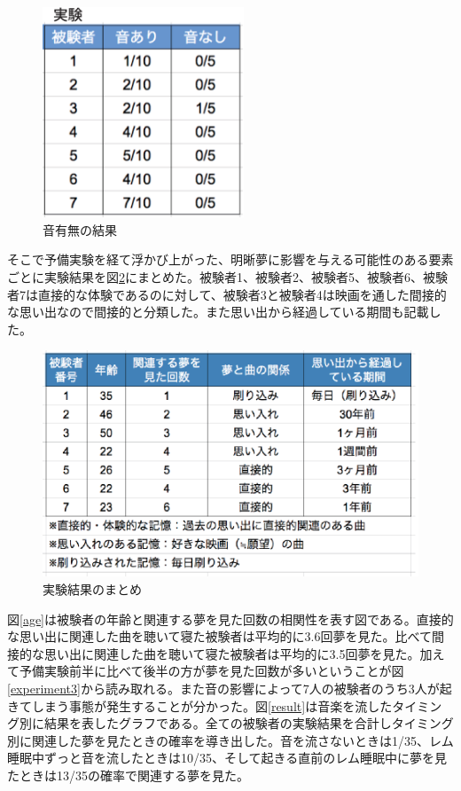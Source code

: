 \begin{figure}[htbp]
\begin{center}
\includegraphics[width=6cm]{eps/musicOnNO.eps}
\caption{音有無の結果}
\label{musciOnNo}
\end{center}
\end{figure}

そこで予備実験を経て浮かび上がった、明晰夢に影響を与える可能性のある要素ごとに実験結果を図\ref{categorizedData}にまとめた。被験者1、被験者2、被験者5、被験者6、被験者7は直接的な体験であるのに対して、被験者3と被験者4は映画を通した間接的な思い出なので間接的と分類した。また思い出から経過している期間も記載した。

\begin{figure}[htbp]
\begin{center}
\includegraphics[width=13cm]{eps/categorizedData.eps}
\caption{実験結果のまとめ}
\label{categorizedData}
\end{center}
\end{figure}

図\ref{age}は被験者の年齢と関連する夢を見た回数の相関性を表す図である。直接的な思い出に関連した曲を聴いて寝た被験者は平均的に3.6回夢を見た。比べて間接的な思い出に関連した曲を聴いて寝た被験者は平均的に3.5回夢を見た。加えて予備実験前半に比べて後半の方が夢を見た回数が多いということが図\ref{experiment3}から読み取れる。また音の影響によって7人の被験者のうち3人が起きてしまう事態が発生することが分かった。図\ref{result}は音楽を流したタイミング別に結果を表したグラフである。全ての被験者の実験結果を合計しタイミング別に関連した夢を見たときの確率を導き出した。音を流さないときは1/35、レム睡眠中ずっと音を流したときは10/35、そして起きる直前のレム睡眠中に夢を見たときは13/35の確率で関連する夢を見た。

